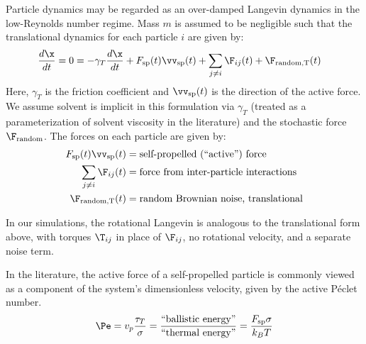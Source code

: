 Particle dynamics may be regarded as an over-damped Langevin dynamics in the low-Reynolds number regime. Mass $m$ is assumed to be negligible such that the translational dynamics for each particle $i$ are given by:
\begin{equation} \label{eq:langevin}
\begin{aligned}
\frac{d\x}{dt} = 0 &= -\gamma_T\frac{d\x}{dt} + F_\text{sp}(t)\vv_\text{sp}(t) + \sum_{j \neq i} \F_{ij}(t) + \F_\text{random,T}(t)
\end{aligned}
\end{equation}
Here, $\gamma_T$ is the friction coefficient and $\vv_\text{sp}(t)$ is the direction of the active force. We assume solvent is implicit in this formulation via $\gamma_T$ (treated as a parameterization of solvent viscosity in the literature) and the stochastic force $\F_\text{random}$. The forces on each particle are given by:
\begin{equation}
\begin{aligned}
F_\text{sp}(t)\vv_\text{sp}(t) &= \text{self-propelled (``active'') force} \\
\sum_{j \neq i} \F_{ij}(t) &= \text{force from inter-particle interactions} \\
\F_\text{random,T}(t) &= \text{random Brownian noise, translational}
\end{aligned}
\end{equation}

In our simulations, the rotational Langevin is analogous to the translational form above, with torques $\T_{ij}$ in place of $\F_{ij}$, no rotational velocity, and a separate noise term.

In the literature, the active force of a self-propelled particle is commonly viewed as a component of the system's dimensionless velocity, given by the active P{\'e}clet number.
\begin{equation}
\Pe = v_p\frac{\tau_T}{\sigma} = \frac{\text{``ballistic energy''}}{\text{``thermal energy''}} = \frac{F_\text{sp}\sigma}{k_BT}
\end{equation}

